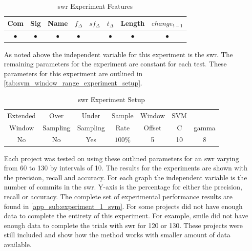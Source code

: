 \begin{table}[h]
\begin{center}

    \begin{tabular}{|c|c|c|c|c|c|c|c|}
        \hline
        Com & Sig & Name & $f_{\Delta}$ & $sf_{\Delta}$ & $t_\Delta$ & Length & $change_{t-1}$ \\
        \hline
        $\bullet$ & $\bullet$ & $\bullet$ & $\bullet$ & & $\bullet$ & $\bullet$ & $\bullet$ \\ \hline
    \end{tabular}
    \caption{\gls{swr} Experiment Features}
    \label{tab:svm_window_range_experiment_features}
\end{center}
\end{table}

As noted above the independent variable for this experiment is the \gls{swr}. The remaining parameters for the experiment are constant for each test. These parameters for this experiment are outlined in \autoref{tab:svm_window_range_experiment_setup}.

\begin{table}[h]
\begin{center}

    \begin{tabular}{|c|c|c|c|c|cc|}
        \hline
        Extended & Over & Under & Sample & Window & SVM & \\
        Window & Sampling & Sampling & Rate & Offset & C & gamma \\ \hline
        No & No & Yes & $100\%$ & 5 & 10 & 8 \\ \hline
    \end{tabular}
    \caption{\gls{swr} Experiment Setup}
    \label{tab:svm_window_range_experiment_setup}
\end{center}

\end{table}

Each project was tested on using these outlined parameters for an \gls{swr} varying from 60 to 130 by intervals of 10. The results for the experiments are shown with the precision, recall and accuracy. For each graph the independent variable is the number of commits in the \gls{swr}. Y-axis is the percentage for either the precision, recall or accuracy. The complete set of experimental performance results are found in \autoref{app_sub:experiment_1_svm}. For some projects did not have enough data to complete the entirety of this experiment. For example, smile did not have enough data to complete the trials with \gls{swr} for 120 or 130. These projects were still included and show how the method works with smaller amount of data available.


